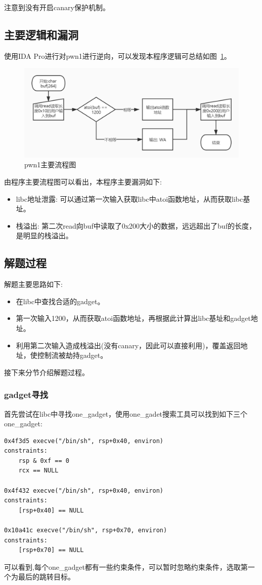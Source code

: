 注意到没有开启canary保护机制。

\subsection{主要逻辑和漏洞}
使用IDA Pro进行对pwn1进行逆向，可以发现本程序逻辑可总结如图~\ref{fig:1}。
\begin{figure}[H]
    \centering
    \includegraphics[width=\textwidth]{WP/pwn/pic/1.jpg}
    \caption{pwn1主要流程图}
    \label{fig:1}
\end{figure}

由程序主要流程图可以看出，本程序主要漏洞如下:
\begin{itemize}
    \item libc地址泄露: 可以通过第一次输入获取libc中atoi函数地址，从而获取libc基址。
    \item 栈溢出: 第二次read向buf中读取了0x200大小的数据，远远超出了buf的长度，是明显的栈溢出。
\end{itemize}

\subsection{解题过程}
解题主要思路如下:
\begin{itemize}
    \item 在libc中查找合适的gadget。
    \item 第一次输入1200，从而获取atoi函数地址，再根据此计算出libc基址和gadget地址。
    \item 利用第二次输入造成栈溢出(没有canary，因此可以直接利用)，覆盖返回地址，使控制流被劫持gadget。
\end{itemize}
接下来分节介绍解题过程。

\subsubsection*{gadget寻找}
首先尝试在libc中寻找one\_gadget，使用one\_gadet搜索工具可以找到如下三个one\_gadget:
\begin{lstlisting}
0x4f3d5 execve("/bin/sh", rsp+0x40, environ)
constraints:
    rsp & 0xf == 0
    rcx == NULL
    
0x4f432 execve("/bin/sh", rsp+0x40, environ)
constraints:
    [rsp+0x40] == NULL

0x10a41c execve("/bin/sh", rsp+0x70, environ)
constraints:
    [rsp+0x70] == NULL
\end{lstlisting}
可以看到,每个one\_gadget都有一些约束条件，可以暂时忽略约束条件，选取第一个为最后的跳转目标。

